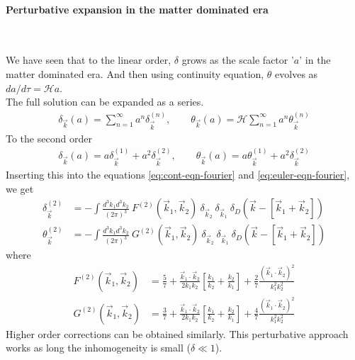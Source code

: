 \documentclass[12pt]{article}
\begin{document}
\paragraph{Perturbative expansion in the matter dominated era}
~\hfill

We have seen that to the linear order, $\delta$ grows as the scale factor '$a$' in the matter dominated era. And then using continuity equation, $\theta$ evolves as $da/d\tau = \mathcal{H}a$.\\
The full solution can be expanded as a series.
\begin{align}
\delta_{\vec{k}}(a) = \sum_{n=1}^{\infty} a^n \delta_{\vec{k}}^{(n)} , \qquad
\theta_{\vec{k}}(a) = \mathcal{H} \sum_{n=1}^{\infty} a^n \theta_{\vec{k}}^{(n)}
\end{align}
%
To the second order
\begin{align}
\delta_{\vec{k}}(a) = a \delta_{\vec{k}}^{(1)} + a^2 \delta_{\vec{k}}^{(2)}, \qquad
\theta_{\vec{k}}(a) = a \theta_{\vec{k}}^{(1)} + a^2 \delta_{\vec{k}}^{(2)}
\end{align}
Inserting this into the equations \eqref{eq:cont-eqn-fourier} and \eqref{eq:euler-eqn-fourier}, we get
\begin{align}
\delta_{\vec{k}}^{(2)} &= - \int \frac{d^3k_1 d^3k_2} { (2 \pi)^3} ~F^{(2)}(\vec{k}_1, \vec{k}_2)  ~\delta_{\vec{k}_2} ~\delta_{\vec{k}_1} ~\delta_D \left( \vec{k} - \left[ \vec{k}_1 + \vec{k}_2 \right] \right)\\
\theta_{\vec{k}}^{(2)} &= - \int \frac{d^3k_1 d^3k_2} { (2 \pi)^3} ~G^{(2)}(\vec{k}_1, \vec{k}_2)  ~\delta_{\vec{k}_2} ~\delta_{\vec{k}_1} ~\delta_D \left( \vec{k} - \left[ \vec{k}_1 + \vec{k}_2 \right] \right)
\end{align}
where 
\begin{align}
F^{(2)}(\vec{k}_1, \vec{k}_2) &= \frac{5}{7} + \frac{ \vec{k}_1 \cdot \vec{k}_2 }{2 k_1 k_2} \left[ \frac{k_1}{k_2} + \frac{k_2}{k_1} \right] + \frac{2}{7} \frac{\left( \vec{k}_1 \cdot \vec{k}_2 \right)^2 }{k_1^2 k_2^2}\\
G^{(2)}(\vec{k}_1, \vec{k}_2) &= \frac{3}{7} + \frac{ \vec{k}_1 \cdot \vec{k}_2 }{2 k_1 k_2} \left[ \frac{k_1}{k_2} + \frac{k_2}{k_1} \right] + \frac{4}{7} \frac{\left( \vec{k}_1 \cdot \vec{k}_2 \right)^2 }{k_1^2 k_2^2}
\end{align}
Higher order corrections can be obtained similarly. This perturbative approach works as long the inhomogeneity is small ($\delta \ll 1$).
\end{document}
